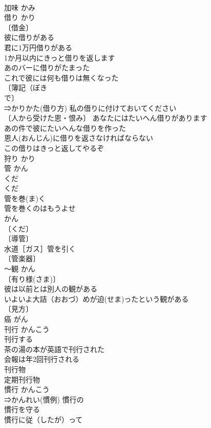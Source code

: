 \documentclass[8pt]{extreport}
\begin{document}
\begin{CJK}{UTF8}{min}
\\	加味	かみ	
\\	借り	かり	
\\	〔借金〕
\\	彼に借りがある 
\\	君に1万円借りがある 
\\	1か月以内にきっと借りを返します 
\\	あのバーに借りがたまった 
\\	これで彼には何も借りは無くなった 
\\	〔簿記（ぼき　
\\	で〕
\\	⇒かりかた(借り方) 私の借りに付けておいてください 
\\	〔人から受けた恩・恨み〕 あなたにはたいへん借りがあります 
\\	あの件で彼にたいへんな借りを作った 
\\	恩人(おんじん)に借りを返さなければならない 
\\	この借りはきっと返してやるぞ 
\\	狩り	かり	
\\	管	かん 
\\	くだ	
\\	くだ 
\\	管を巻(ま)く 
\\	管を巻くのはもうよせ 
\\	かん 
\\	〔くだ〕
\\	〔導管〕
\\	水道［ガス］管を引く 
\\	〔管楽器〕
\\	～観	かん	
\\	〔有り様(さま)〕
\\	彼は以前とは別人の観がある 
\\	いよいよ大詰（おおづ）めが迫(せま)ったという観がある 
\\	〔見方〕
\\	癌	がん	
\\	刊行	かんこう	
\\	刊行する 
\\	茶の湯の本が英語で刊行された 
\\	会報は年2回刊行される 
\\	刊行物 
\\	定期刊行物 
\\	慣行	かんこう	
\\	⇒かんれい(慣例) 慣行の 
\\	慣行を守る 
\\	慣行に従（したが）って 

\end{CJK}
\end{document}
